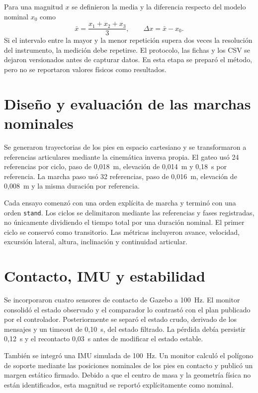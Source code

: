 Para una magnitud $x$ se definieron la media y la diferencia respecto del
modelo nominal $x_0$ como
\begin{equation}
  \bar{x}=\frac{x_1+x_2+x_3}{3}, \qquad \Delta x=\bar{x}-x_0.
\end{equation}
Si el intervalo entre la mayor y la menor repetición supera dos veces la
resolución del instrumento, la medición debe repetirse. El protocolo, las
fichas y los CSV se dejaron versionados antes de capturar datos. En esta etapa
se preparó el método, pero no se reportaron valores físicos como resultados.

\section{Diseño y evaluación de las marchas nominales}

Se generaron trayectorias de los pies en espacio cartesiano y se transformaron
a referencias articulares mediante la cinemática inversa propia. El gateo usó
24 referencias por ciclo, paso de 0,018~m, elevación de 0,014~m y 0,18~s por
referencia. La marcha paso usó 32 referencias, paso de 0,016~m, elevación de
0,008~m y la misma duración por referencia.

Cada ensayo comenzó con una orden explícita de marcha y terminó con una orden
\texttt{stand}. Los ciclos se delimitaron mediante las referencias y fases
registradas, no únicamente dividiendo el tiempo total por una duración nominal.
El primer ciclo se conservó como transitorio. Las métricas incluyeron avance,
velocidad, excursión lateral, altura, inclinación y continuidad articular.

\section{Contacto, IMU y estabilidad}

Se incorporaron cuatro sensores de contacto de Gazebo a 100~Hz. El monitor
consolidó el estado observado y el comparador lo contrastó con el plan publicado
por el controlador. Posteriormente se separó el estado crudo, derivado de los
mensajes y un timeout de 0,10~s, del estado filtrado. La pérdida debía persistir
0,12~s y el recontacto 0,03~s antes de modificar el estado estable.

También se integró una IMU simulada de 100~Hz. Un monitor calculó el polígono de
soporte mediante las posiciones nominales de los pies en contacto y publicó un
margen estático firmado. Debido a que el centro de masa y la geometría física
no están identificados, esta magnitud se reportó explícitamente como nominal.

